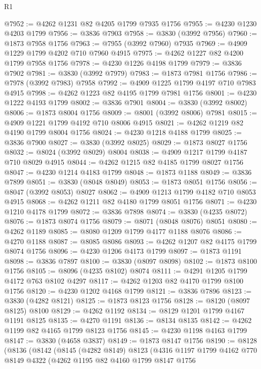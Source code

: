 \begin{lexlean}{R1}
\begin{coremodule}
@7952 := @4262 @1231 @82 @4205 @1799 @7935 @1756
@7955 := @4230 @1230 @4203 @1799
@7956 := @3836 @7903
@7958 := @3830 (@3992 @7956)
@7960 := @1873 @7958 @1756
@7963 := @7955 (@3992 @7960) @7935
@7969 := @4909 @1229 @1799 @4202 @710 @7960 @4915
@7975 := @4262 @1227 @82 @4200 @1799 @7958 @1756
@7978 := @4230 @1226 @4198 @1799
@7979 := @3836 @7902
@7981 := @3830 (@3992 @7979)
@7983 := @1873 @7981 @1756
@7986 := @7978 (@3992 @7983) @7958
@7992 := @4909 @1225 @1799 @4197 @710 @7983 @4915
@7998 := @4262 @1223 @82 @4195 @1799 @7981 @1756
@8001 := @4230 @1222 @4193 @1799
@8002 := @3836 @7901
@8004 := @3830 (@3992 @8002)
@8006 := @1873 @8004 @1756
@8009 := @8001 (@3992 @8006) @7981
@8015 := @4909 @1221 @1799 @4192 @710 @8006 @4915
@8021 := @4262 @1219 @82 @4190 @1799 @8004 @1756
@8024 := @4230 @1218 @4188 @1799
@8025 := @3836 @7900
@8027 := @3830 (@3992 @8025)
@8029 := @1873 @8027 @1756
@8032 := @8024 (@3992 @8029) @8004
@8038 := @4909 @1217 @1799 @4187 @710 @8029 @4915
@8044 := @4262 @1215 @82 @4185 @1799 @8027 @1756
@8047 := @4230 @1214 @4183 @1799
@8048 := @1873 @1188
@8049 := @3836 @7899
@8051 := @3830 (@8048 @8049)
@8053 := @1873 @8051 @1756
@8056 := @8047 (@3992 @8053) @8027
@8062 := @4909 @1213 @1799 @4182 @710 @8053 @4915
@8068 := @4262 @1211 @82 @4180 @1799 @8051 @1756
@8071 := @4230 @1210 @4178 @1799
@8072 := @3836 @7898
@8074 := @3830 (@4235 @8072)
@8076 := @1873 @8074 @1756
@8079 := @8071 (@8048 @8076) @8051
@8080 := @4262 @1189
@8085 := @8080 @1209 @1799 @4177 @1188 @8076
@8086 := @4270 @1188
@8087 := @8085 @8086
@8093 := @4262 @1207 @82 @4175 @1799 @8074 @1756
@8096 := @4230 @1206 @4173 @1799
@8097 := @1873 @1191
@8098 := @3836 @7897
@8100 := @3830 (@8097 @8098)
@8102 := @1873 @8100 @1756
@8105 := @8096 (@4235 @8102) @8074
@8111 := @4291 @1205 @1799 @4172 @763 @8102 @4297
@8117 := @4262 @1203 @82 @4170 @1799 @8100 @1756
@8120 := @4230 @1202 @4168 @1799
@8121 := @3836 @7896
@8123 := @3830 (@4282 @8121)
@8125 := @1873 @8123 @1756
@8128 := @8120 (@8097 @8125) @8100
@8129 := @4262 @1192
@8134 := @8129 @1201 @1799 @4167 @1191 @8125
@8135 := @4270 @1191
@8136 := @8134 @8135
@8142 := @4262 @1199 @82 @4165 @1799 @8123 @1756
@8145 := @4230 @1198 @4163 @1799
@8147 := @3830 (@4658 @3837)
@8149 := @1873 @8147 @1756
@8190 := @8128
    (@8136
      (@8142
        (@8145
          (@4282 @8149)
          @8123
          (@4316
            @1197
            @1799
            @4162
            @770
            @8149
            @4322
            (@4262
              @1195
              @82
              @4160
              @1799
              @8147
              @1756

\end{coremodule}
\end{lexlean}
